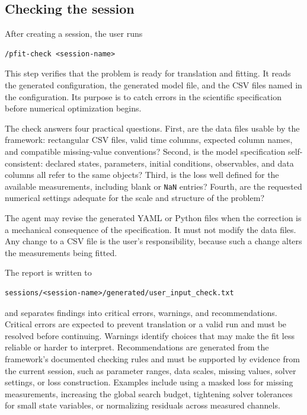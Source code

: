 \subsection{Checking the session}
\label{sec:pfit-check}

After creating a session, the user runs

\begin{verbatim}
/pfit-check <session-name>
\end{verbatim}

This step verifies that the problem is ready for translation and fitting. It
reads the generated configuration, the generated model file, and the CSV files
named in the configuration. Its purpose is to catch errors in the scientific
specification before numerical optimization begins.

The check answers four practical questions. First, are the data files usable by
the framework: rectangular CSV files, valid time columns, expected column names,
and compatible missing-value conventions? Second, is the model specification
self-consistent: declared states, parameters, initial conditions, observables,
and data columns all refer to the same objects? Third, is the loss well defined
for the available measurements, including blank or \texttt{NaN} entries? Fourth,
are the requested numerical settings adequate for the scale and structure of
the problem?

The agent may revise the generated YAML or Python files when the correction is
a mechanical consequence of the specification. It must not modify the data
files. Any change to a CSV file is the user's responsibility, because such a
change alters the measurements being fitted.

The report is written to

\begin{verbatim}
sessions/<session-name>/generated/user_input_check.txt
\end{verbatim}

and separates findings into critical errors, warnings, and recommendations.
Critical errors are expected to prevent translation or a valid run and must be
resolved before continuing. Warnings identify choices that may make the fit less
reliable or harder to interpret. Recommendations are generated from the
framework's documented checking rules and must be supported by evidence from
the current session, such as parameter ranges, data scales, missing values,
solver settings, or loss construction. Examples include using a masked loss for
missing measurements, increasing the global search budget, tightening solver
tolerances for small state variables, or normalizing residuals across measured
channels.

